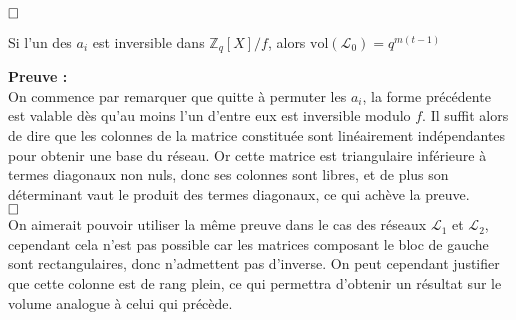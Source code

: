 \documentclass[11pt,a4paper]{article}
\begin{document}
$\hfill \square$

\begin{theorem}

Si l'un des $a_i$ est inversible dans $\mathbb{Z}_q[X]/f$, alors $\text{vol}(\mathcal{L}_0) = q^{m(t-1)}$
\end{theorem}
\textbf{Preuve :}\\
On commence par remarquer que quitte à permuter les $a_i$, la forme précédente est valable dès qu'au moins l'un d'entre eux est inversible modulo $f$. Il suffit alors de dire que les colonnes de la matrice constituée sont linéairement indépendantes pour obtenir une base du réseau. Or cette matrice est triangulaire inférieure à termes diagonaux non nuls, donc ses colonnes sont libres, et de plus son déterminant vaut le produit des termes diagonaux, ce qui achève la preuve. \\

$\hfill \square$ \\

On aimerait pouvoir utiliser la même preuve dans le cas des réseaux $\mathcal{L}_1$ et $\mathcal{L}_2$, cependant cela n'est pas possible car les matrices composant le bloc de gauche sont rectangulaires, donc n'admettent pas d'inverse. On peut cependant justifier que cette colonne est de rang plein, ce qui permettra d'obtenir un résultat sur le volume analogue à celui qui précède.
\end{document}
